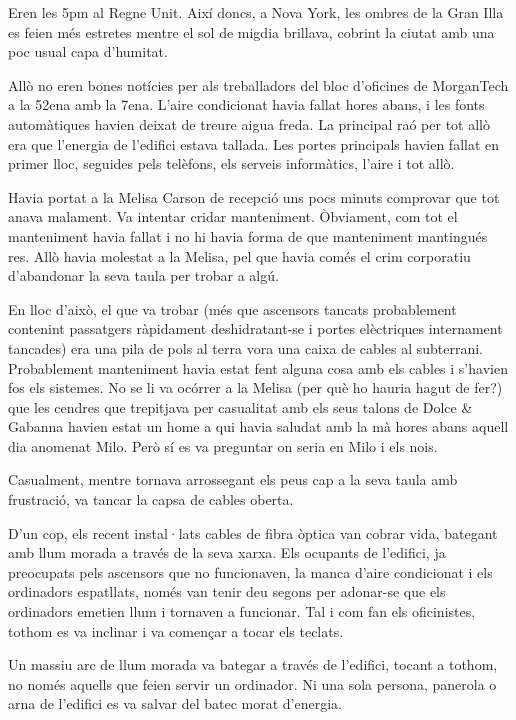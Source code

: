 Eren les 5pm al Regne Unit. Així doncs, a Nova York, les ombres de la
Gran Illa es feien més estretes mentre el sol de migdia brillava,
cobrint la ciutat amb una poc usual capa d'humitat.

Allò no eren bones notícies per als treballadors del bloc d'oficines de
MorganTech a la 52ena amb la 7ena. L'aire condicionat havia fallat hores
abans, i les fonts automàtiques havien deixat de treure aigua freda. La
principal raó per tot allò era que l'energia de l'edifici estava
tallada. Les portes principals havien fallat en primer lloc, seguides
pels telèfons, els serveis informàtics, l'aire i tot allò.

Havia portat a la Melisa Carson de recepció uns pocs minuts comprovar
que tot anava malament. Va intentar cridar manteniment. Òbviament, com
tot el manteniment havia fallat i no hi havia forma de que manteniment
mantingués res. Allò havia molestat a la Melisa, pel que havia comés el
crim corporatiu d'abandonar la seva taula per trobar a algú.

En lloc d'això, el que va trobar (més que ascensors tancats probablement
contenint passatgers ràpidament deshidratant-se i portes elèctriques
internament tancades) era una pila de pols al terra vora una caixa de
cables al subterrani. Probablement manteniment havia estat fent alguna
cosa amb els cables i s'havien fos els sistemes. No se li va ocórrer a
la Melisa (per què ho hauria hagut de fer?) que les cendres que
trepitjava per casualitat amb els seus talons de Dolce \& Gabanna havien
estat un home a qui havia saludat amb la mà hores abans aquell dia
anomenat Milo. Però sí es va preguntar on seria en Milo i els nois.

Casualment, mentre tornava arrossegant els peus cap a la seva taula amb
frustració, va tancar la capsa de cables oberta.

D'un cop, els recent instal·lats cables de fibra òptica van cobrar vida,
bategant amb llum morada a través de la seva xarxa. Els ocupants de
l'edifici, ja preocupats pels ascensors que no funcionaven, la manca
d'aire condicionat i els ordinadors espatllats, només van tenir deu
segons per adonar-se que els ordinadors emetien llum i tornaven a
funcionar. Tal i com fan els oficinistes, tothom es va inclinar i va
començar a tocar els teclats.

Un massiu arc de llum morada va bategar a través de l'edifici, tocant a
tothom, no només aquells que feien servir un ordinador. Ni una sola
persona, panerola o arna de l'edifici es va salvar del batec morat
d'energia.

